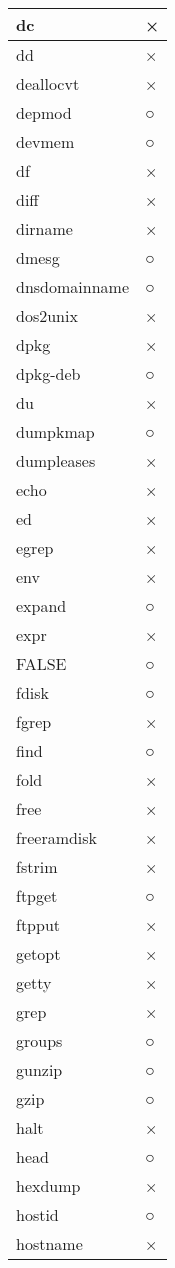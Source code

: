 \begin{longtable}{p{80mm}p{80mm}}
dc & × \\ \hline
dd & × \\ \hline
deallocvt & × \\ \hline
depmod & ○ \\ \hline
devmem & ○ \\ \hline
df & × \\ \hline
diff & × \\ \hline
dirname & × \\ \hline
dmesg & ○ \\ \hline
dnsdomainname & ○ \\ \hline
dos2unix & × \\ \hline
dpkg & × \\ \hline
dpkg-deb & ○ \\ \hline
du & × \\ \hline
dumpkmap & ○ \\ \hline
dumpleases & × \\ \hline
echo & × \\ \hline
ed & × \\ \hline
egrep & × \\ \hline
env & × \\ \hline
expand & ○ \\ \hline
expr & × \\ \hline
FALSE & ○ \\ \hline
fdisk & ○ \\ \hline
fgrep & × \\ \hline
find & ○ \\ \hline
fold & × \\ \hline
free & × \\ \hline
freeramdisk & × \\ \hline
fstrim & × \\ \hline
ftpget & ○ \\ \hline
ftpput & × \\ \hline
getopt & × \\ \hline
getty & × \\ \hline
grep & × \\ \hline
groups & ○ \\ \hline
gunzip & ○ \\ \hline
gzip & ○ \\ \hline
halt & × \\ \hline
head & ○ \\ \hline
hexdump & × \\ \hline
hostid & ○ \\ \hline
hostname & × \\ \hline

\end{longtable}

